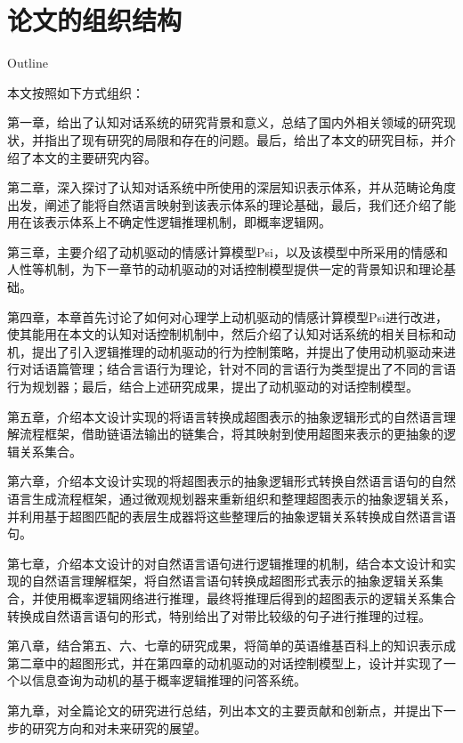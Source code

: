 \section{论文的组织结构}{Outline}

本文按照如下方式组织：

第一章，给出了认知对话系统的研究背景和意义，总结了国内外相关领域的研究现状，并指出了现有研究的局限和存在的问题。最后，给出了本文的研究目标，并介绍了本文的主要研究内容。

第二章，深入探讨了认知对话系统中所使用的深层知识表示体系，并从范畴论角度出发，阐述了能将自然语言映射到该表示体系的理论基础，最后，我们还介绍了能用在该表示体系上不确定性逻辑推理机制，即概率逻辑网。

第三章，主要介绍了动机驱动的情感计算模型Psi，以及该模型中所采用的情感和人性等机制，为下一章节的动机驱动的对话控制模型提供一定的背景知识和理论基础。

第四章，本章首先讨论了如何对心理学上动机驱动的情感计算模型Psi进行改进，使其能用在本文的认知对话控制机制中，然后介绍了认知对话系统的相关目标和动机，提出了引入逻辑推理的动机驱动的行为控制策略，并提出了使用动机驱动来进行对话语篇管理；结合言语行为理论，针对不同的言语行为类型提出了不同的言语行为规划器；最后，结合上述研究成果，提出了动机驱动的对话控制模型。

第五章，介绍本文设计实现的将语言转换成超图表示的抽象逻辑形式的自然语言理解流程框架，借助链语法输出的链集合，将其映射到使用超图来表示的更抽象的逻辑关系集合。

第六章，介绍本文设计实现的将超图表示的抽象逻辑形式转换自然语言语句的自然语言生成流程框架，通过微观规划器来重新组织和整理超图表示的抽象逻辑关系，并利用基于超图匹配的表层生成器将这些整理后的抽象逻辑关系转换成自然语言语句。

第七章，介绍本文设计的对自然语言语句进行逻辑推理的机制，结合本文设计和实现的自然语言理解框架，将自然语言语句转换成超图形式表示的抽象逻辑关系集合，并使用概率逻辑网络进行推理，最终将推理后得到的超图表示的逻辑关系集合转换成自然语言语句的形式，特别给出了对带比较级的句子进行推理的过程。

第八章，结合第五、六、七章的研究成果，将简单的英语维基百科上的知识表示成第二章中的超图形式，并在第四章的动机驱动的对话控制模型上，设计并实现了一个以信息查询为动机的基于概率逻辑推理的问答系统。

第九章，对全篇论文的研究进行总结，列出本文的主要贡献和创新点，并提出下一步的研究方向和对未来研究的展望。



